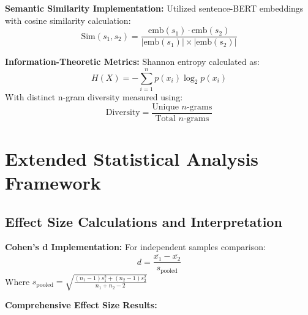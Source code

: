 \documentclass{article}
\begin{document}
\textbf{Semantic Similarity Implementation:}
Utilized sentence-BERT embeddings with cosine similarity calculation:
\begin{equation}
\text{Sim}(s_1, s_2) = \frac{\text{emb}(s_1) \cdot \text{emb}(s_2)}{|\text{emb}(s_1)| \times |\text{emb}(s_2)|}
\end{equation}

\textbf{Information-Theoretic Metrics:}
Shannon entropy calculated as:
\begin{equation}
H(X) = -\sum_{i=1}^{n} p(x_i) \log_2 p(x_i)
\end{equation}
With distinct n-gram diversity measured using:
\begin{equation}
\text{Diversity} = \frac{\text{Unique $n$-grams}}{\text{Total $n$-grams}}
\end{equation}

\section{Extended Statistical Analysis Framework}
\label{appendix:statistical_methods}

\subsection{Effect Size Calculations and Interpretation}

\textbf{Cohen's d Implementation:}
For independent samples comparison:
\begin{equation}
d = \frac{\bar{x_1} - \bar{x_2}}{s_{\text{pooled}}}
\end{equation}
Where $s_{\text{pooled}} = \sqrt{\frac{(n_1-1)s_1^2 + (n_2-1)s_2^2}{n_1 + n_2 - 2}}$

\textbf{Comprehensive Effect Size Results:}
\end{document}
